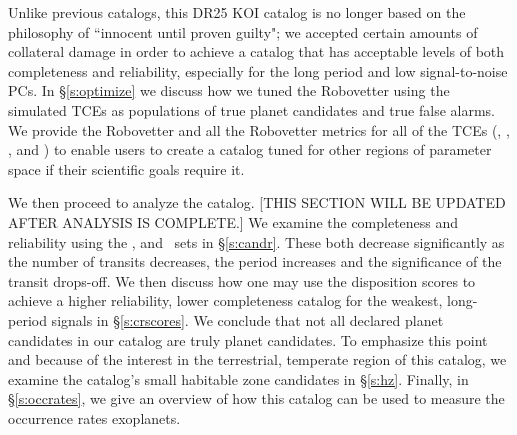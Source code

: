 
Unlike previous catalogs, this DR25 KOI catalog is no longer based on the philosophy of ``innocent until proven guilty"; we accepted certain amounts of collateral damage in order to achieve a catalog that has acceptable levels of both completeness and reliability, especially for the long period and low signal-to-noise PCs. In \S\ref{s:optimize} we discuss how we tuned the Robovetter using the simulated TCEs as populations of true planet candidates and true false alarms. We provide the Robovetter and all the Robovetter metrics for all of the TCEs (\opstce, \injtce, \invtce, and \scrtce) to enable users to create a catalog tuned for other regions of parameter space if their scientific goals require it. 

We then proceed to analyze the catalog. [THIS SECTION WILL BE UPDATED AFTER ANALYSIS IS COMPLETE.] We examine the completeness and reliability using the \injtce, \invtce and \scrtce\ sets in \S\ref{s:candr}. These both decrease significantly as the number of transits decreases, the period increases and the significance of the transit drops-off.  We then discuss how one may use the disposition scores to achieve a higher reliability, lower completeness catalog for the weakest, long-period signals in \S\ref{s:crscores}.  We conclude that not all declared planet candidates in our catalog are truly planet candidates. To emphasize this point and because of the interest in the terrestrial, temperate region of this catalog, we examine the catalog's small habitable zone candidates in \S\ref{s:hz}. Finally, in \S\ref{s:occrates}, we give an overview of how this catalog can be used to measure the occurrence rates exoplanets.




